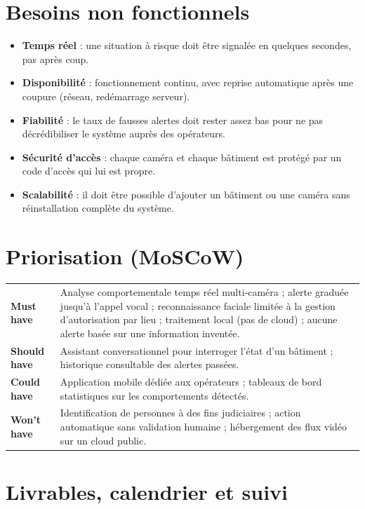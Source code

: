 \documentclass[11pt,a4paper]{article}
\begin{document}
\section{Besoins non fonctionnels}
\begin{itemize}[leftmargin=1.4em, itemsep=2pt]
  \item \textbf{Temps réel} : une situation à risque doit être signalée en quelques secondes, pas après coup.
  \item \textbf{Disponibilité} : fonctionnement continu, avec reprise automatique après une coupure (réseau, redémarrage serveur).
  \item \textbf{Fiabilité} : le taux de fausses alertes doit rester assez bas pour ne pas décrédibiliser le système auprès des opérateurs.
  \item \textbf{Sécurité d'accès} : chaque caméra et chaque bâtiment est protégé par un code d'accès qui lui est propre.
  \item \textbf{Scalabilité} : il doit être possible d'ajouter un bâtiment ou une caméra sans réinstallation complète du système.
\end{itemize}

\section{Priorisation (MoSCoW)}

\begin{longtable}{@{}p{}p{}@{}}
\textbf{Must have} & Analyse comportementale temps réel multi-caméra ; alerte graduée jusqu'à l'appel vocal ; reconnaissance faciale limitée à la gestion d'autorisation par lieu ; traitement local (pas de cloud) ; aucune alerte basée sur une information inventée. \\[6pt]
\textbf{Should have} & Assistant conversationnel pour interroger l'état d'un bâtiment ; historique consultable des alertes passées. \\[6pt]
\textbf{Could have} & Application mobile dédiée aux opérateurs ; tableaux de bord statistiques sur les comportements détectés. \\[6pt]
\textbf{Won't have} & Identification de personnes à des fins judiciaires ; action automatique sans validation humaine ; hébergement des flux vidéo sur un cloud public. \\
\end{longtable}

\section{Livrables, calendrier et suivi}
\end{document}
